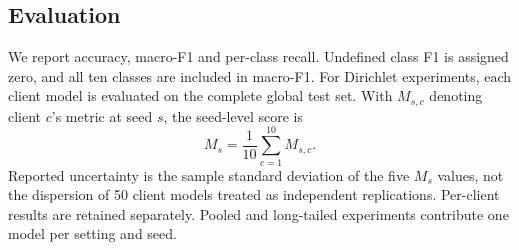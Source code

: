 \subsection{Evaluation}
We report accuracy, macro-F1 and per-class recall. Undefined class F1 is assigned zero, and all ten classes are included in macro-F1. For Dirichlet experiments, each client model is evaluated on the complete global test set. With $M_{s,c}$ denoting client $c$'s metric at seed $s$, the seed-level score is
\begin{equation}
 M_s=\frac{1}{10}\sum_{c=1}^{10}M_{s,c}.
\end{equation}
Reported uncertainty is the sample standard deviation of the five $M_s$ values, not the dispersion of 50 client models treated as independent replications. Per-client results are retained separately. Pooled and long-tailed experiments contribute one model per setting and seed.
